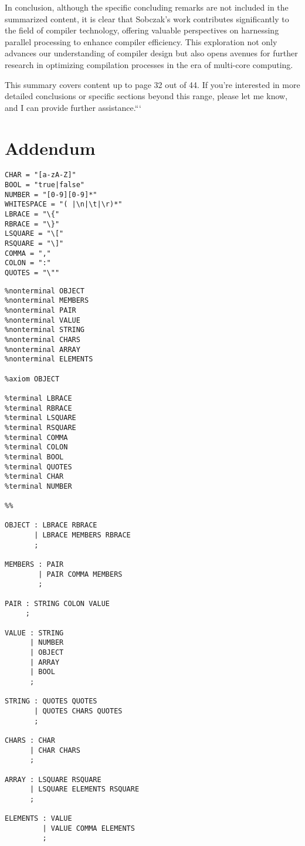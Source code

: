 In conclusion, although the specific concluding remarks are not included in the
summarized content, it is clear that Sobczak's work contributes significantly to
the field of compiler technology, offering valuable perspectives on harnessing
parallel processing to enhance compiler efficiency. This exploration not only
advances our understanding of compiler design but also opens avenues for further
research in optimizing compilation processes in the era of multi-core computing.

This summary covers content up to page 32 out of 44. If you're interested in
more detailed conclusions or specific sections beyond this range, please let me
know, and I can provide further assistance.```



\chapter{Addendum} \label{addendum}
\begin{listing}
\begin{verbatim}
CHAR = "[a-zA-Z]"
BOOL = "true|false"
NUMBER = "[0-9][0-9]*"
WHITESPACE = "( |\n|\t|\r)*"
LBRACE = "\{"
RBRACE = "\}"
LSQUARE = "\["
RSQUARE = "\]"
COMMA = ","
COLON = ":"
QUOTES = "\""
\end{verbatim}
\caption{JSON lexical grammar keywords and their corresponding regular expressions}
\label{lst:json_lexical_grammar}
\end{listing}

\begin{listing}
\begin{verbatim}
%nonterminal OBJECT
%nonterminal MEMBERS
%nonterminal PAIR
%nonterminal VALUE
%nonterminal STRING
%nonterminal CHARS
%nonterminal ARRAY
%nonterminal ELEMENTS

%axiom OBJECT

%terminal LBRACE
%terminal RBRACE
%terminal LSQUARE
%terminal RSQUARE
%terminal COMMA
%terminal COLON
%terminal BOOL
%terminal QUOTES
%terminal CHAR
%terminal NUMBER

%%

OBJECT : LBRACE RBRACE
       | LBRACE MEMBERS RBRACE
       ;

MEMBERS : PAIR
        | PAIR COMMA MEMBERS
        ;

PAIR : STRING COLON VALUE
     ;

VALUE : STRING
      | NUMBER
      | OBJECT
      | ARRAY
      | BOOL
      ;

STRING : QUOTES QUOTES
       | QUOTES CHARS QUOTES
       ;

CHARS : CHAR
      | CHAR CHARS
      ;

ARRAY : LSQUARE RSQUARE
      | LSQUARE ELEMENTS RSQUARE
      ;

ELEMENTS : VALUE
         | VALUE COMMA ELEMENTS
         ;
\end{verbatim}
\caption{An operator precedence parsing grammar for JSON.}
\label{lst:json_grammar}
\end{listing}
